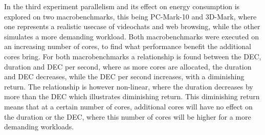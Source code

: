 In the third experiment parallelism and its effect on energy consumption is explored on two macrobenchmarks, this being PC-Mark-10 and 3D-Mark, where one represents a realistic usecase of videochats and web browsing, while the other simulates a more demanding workload. Both macrobenchmarks were executed on an increasing number of cores, to find what performance benefit the additional cores bring. For both macrobenchmarks a relationship is found between the DEC, duration and DEC per second, where as more cores are allocated, the duration and DEC decreases, while the DEC per second increases, with a diminishing return. The relationship is however non-linear, where the duration decreases by more than the DEC which illustrates diminishing return. This diminishing return means that at a certain number of cores, additional cores will have no effect on the duration or the DEC, where this number of cores will be higher for a more demanding workloads.


